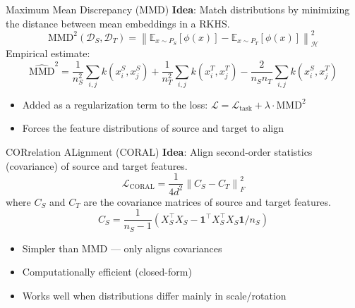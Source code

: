 \documentclass[11pt]{beamer}
\begin{document}
\begin{frame}{Maximum Mean Discrepancy (MMD)}
    \textbf{Idea}: Match distributions by minimizing the distance between mean embeddings in a RKHS.
    \[
        \text{MMD}^2(\mathcal{D}_S, \mathcal{D}_T) = \left\| \mathbb{E}_{x \sim P_S}[\phi(x)] - \mathbb{E}_{x \sim P_T}[\phi(x)] \right\|^2_{\mathcal{H}}
    \]
    Empirical estimate:
    \[
        \widehat{\text{MMD}}^2 = \frac{1}{n_S^2}\sum_{i,j} k(x_i^S, x_j^S) + \frac{1}{n_T^2}\sum_{i,j} k(x_i^T, x_j^T) - \frac{2}{n_S n_T}\sum_{i,j} k(x_i^S, x_j^T)
    \]
    \begin{itemize}
        \item Added as a regularization term to the loss: $\mathcal{L} = \mathcal{L}_{\text{task}} + \lambda \cdot \text{MMD}^2$
        \item Forces the feature distributions of source and target to align
    \end{itemize}
\end{frame}

\begin{frame}{CORrelation ALignment (CORAL)}
    \textbf{Idea}: Align second-order statistics (covariance) of source and target features.
    \[
        \mathcal{L}_{\text{CORAL}} = \frac{1}{4d^2} \left\| C_S - C_T \right\|_F^2
    \]
    where $C_S$ and $C_T$ are the covariance matrices of source and target features.
    \[
        C_S = \frac{1}{n_S-1}(X_S^\top X_S - \mathbf{1}^\top X_S^\top X_S \mathbf{1}/n_S)
    \]
    \begin{itemize}
        \item Simpler than MMD — only aligns covariances
        \item Computationally efficient (closed-form)
        \item Works well when distributions differ mainly in scale/rotation
    \end{itemize}
\end{frame}
\end{document}
